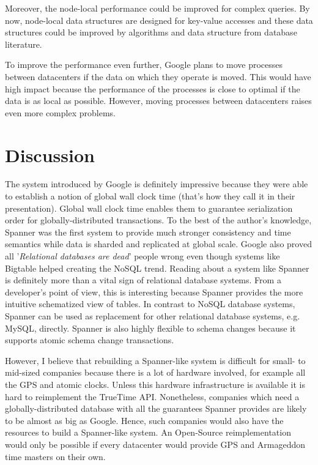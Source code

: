 \documentclass[onecolumn, a4paper, 10pt]{article}
\begin{document}
Moreover, the node-local performance could be improved for complex queries. By
now, node-local data structures are designed for key-value accesses and these data
structures could be improved by algorithms and data structure from database
literature.

To improve the performance even further, Google plans to move processes between
datacenters if the data on which they operate is moved. This would have high
impact because the performance of the processes is close to optimal if the data
is as local as possible. However, moving processes between datacenters raises
even more complex problems.

\section{Discussion}
\label{sec:discussion}

The system introduced by Google is definitely impressive because they were able
to establish a notion of global wall clock time (that's how they call it in their
presentation). Global wall clock time enables them to guarantee serialization order
for globally-distributed transactions. To the best of the author's knowledge, Spanner
was the first system to provide much stronger consistency and time semantics while
data is sharded and replicated at global scale. Google also proved all
'\emph{Relational databases are dead}' people wrong even though systems like
Bigtable helped creating the NoSQL trend. Reading about a system like Spanner is
definitely more than a vital sign of relational database systems. From a
developer's point of view, this is interesting because Spanner provides
the more intuitive schematized view of tables. In contrast to NoSQL database
systems, Spanner can be used as replacement for other relational database
systems, e.g. MySQL, directly. Spanner is also highly flexible to schema changes
because it supports atomic schema change transactions.

However, I believe that rebuilding a Spanner-like system is difficult for
small- to mid-sized companies because there is a lot of hardware involved, for
example all the GPS and atomic clocks. Unless this hardware infrastructure is
available it is hard to reimplement the TrueTime API. Nonetheless,
companies which need a globally-distributed database with all the guarantees
Spanner provides are likely to be almost as big as Google. Hence, such companies
would also have the resources to build a Spanner-like system. An Open-Source
reimplementation would only be possible if every datacenter would provide GPS
and Armageddon time masters on their own.
\end{document}
